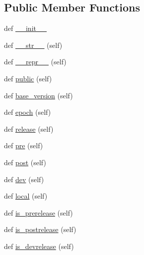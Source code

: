 \subsection*{Public Member Functions}
\begin{DoxyCompactItemize}
\item 
def \hyperlink{classpip_1_1__vendor_1_1packaging_1_1version_1_1LegacyVersion_a0535299038462fbcc5d8c9da1ff89cf5}{\+\_\+\+\_\+init\+\_\+\+\_\+}
\item 
def \hyperlink{classpip_1_1__vendor_1_1packaging_1_1version_1_1LegacyVersion_a6c2883cc191f134f8066910605dce7bc}{\+\_\+\+\_\+str\+\_\+\+\_\+} (self)
\item 
def \hyperlink{classpip_1_1__vendor_1_1packaging_1_1version_1_1LegacyVersion_a5f884695f13a9b2077f5b0029ac1c0b2}{\+\_\+\+\_\+repr\+\_\+\+\_\+} (self)
\item 
def \hyperlink{classpip_1_1__vendor_1_1packaging_1_1version_1_1LegacyVersion_a9da147487f19fbce3ffee42c66349c8d}{public} (self)
\item 
def \hyperlink{classpip_1_1__vendor_1_1packaging_1_1version_1_1LegacyVersion_a50772cdb6d45c175a38fda7ec6e5f8df}{base\+\_\+version} (self)
\item 
def \hyperlink{classpip_1_1__vendor_1_1packaging_1_1version_1_1LegacyVersion_aabb7e30e4c378f77ab2548c5cfe140b2}{epoch} (self)
\item 
def \hyperlink{classpip_1_1__vendor_1_1packaging_1_1version_1_1LegacyVersion_adc5a60adcb101a0beb4515273da72030}{release} (self)
\item 
def \hyperlink{classpip_1_1__vendor_1_1packaging_1_1version_1_1LegacyVersion_ac646d267ee7e71eda88e3fb58952be78}{pre} (self)
\item 
def \hyperlink{classpip_1_1__vendor_1_1packaging_1_1version_1_1LegacyVersion_a863de4eafb0a163439c70e8ade8f6e77}{post} (self)
\item 
def \hyperlink{classpip_1_1__vendor_1_1packaging_1_1version_1_1LegacyVersion_acc76803cd0fa8bf5977064f0d65b519b}{dev} (self)
\item 
def \hyperlink{classpip_1_1__vendor_1_1packaging_1_1version_1_1LegacyVersion_aa9235448296342c68fdf10eb62df58d2}{local} (self)
\item 
def \hyperlink{classpip_1_1__vendor_1_1packaging_1_1version_1_1LegacyVersion_a0da8ea4118325e186966d2f98568baea}{is\+\_\+prerelease} (self)
\item 
def \hyperlink{classpip_1_1__vendor_1_1packaging_1_1version_1_1LegacyVersion_a1fb443c341afc18ba217c234929ddcc3}{is\+\_\+postrelease} (self)
\item 
def \hyperlink{classpip_1_1__vendor_1_1packaging_1_1version_1_1LegacyVersion_a0029e4e27228b99328a4a94f48fd6ca8}{is\+\_\+devrelease} (self)
\end{DoxyCompactItemize}


